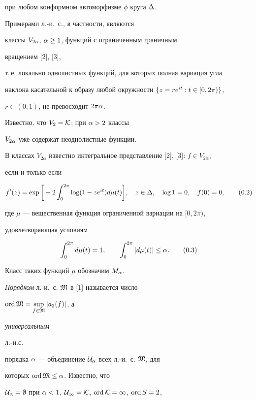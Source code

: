 при любом конформном автоморфизме $\phi$ круга $\Delta$.


Примерами л.-и.~с., в частности, являются


классы $V_{2\alpha}$, $\alpha\ge 1$, функций с ограниченным граничным


вращением [2], [3],


т.\,е. локально однолистных функций, для которых полная вариация угла


наклона касательной к образу любой окружности $\{z=re^{it}: t\in[0,2\pi)\}$,


$r\in (0,1)$, не превосходит $2\pi\alpha$.


Известно, что $V_{2}=\cal K$; при $\alpha >2$ классы


$V_{2\alpha}$ уже содержат неоднолистные функции.





В классах $V_{2\alpha}$ известно интегральное представление [2], [3]: $f\in V_{2\alpha}$,


если и только если


\begin{equation}


f'(z)=\exp\bigg[-2\int_0^{2\pi}\log(1-z\et)d\mu(t)\bigg], \quad z\in\De,


\quad \log 1=0,\quad f(0)=0, \tag{0.2}


\end{equation}


где $\mu$ --- вещественная функция ограниченной вариации на $[0,2\pi)$,


удовлетворяющая условиям


\begin{equation}


\int_0^{2\pi}d\mu(t)=1, \qquad \int_0^{2\pi}|d\mu(t)|\le \al. \tag{0.3}


\end{equation}


Класс таких функций $\mu$ обозначим $M_\alpha$.





{\it Порядком} л.-и.~с. $\frak M$ в [1] называется число


$\operatorname{ord} \frak M=\sup\limits_{f\in\frak M} |a_2(f)|$, а {\it универсальным


л.-и.с.} порядка $\alpha$ --- объединение $\cal U_\alpha$ всех л.-и.~с. $\frak M$, для


которых $\operatorname{ord} \frak M \le\alpha$. Известно, что


$\cal U_\alpha=\emptyset$ при $\alpha<1$, $\cal U_1=\cal K$, $\operatorname{ord} \cal K=1$, $\operatorname{ord} S=2$,


